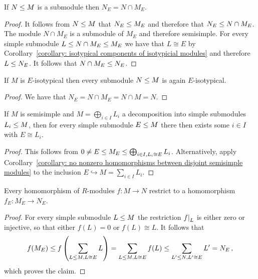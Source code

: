 \begin{lemma}
  If $N \leq M$ is a submodule then $N_E = N \cap M_E$.
\end{lemma}


\begin{proof}
  It follows from $N \leq M$ that $N_E \leq M_E$ and therefore that $N_E \leq N \cap M_E$.
  The module $N \cap M_E$ is a submodule of $M_E$ and therefore semisimple.
  For every simple submodule $L \leq N \cap M_E \leq M_E$ we have that $L \cong E$ by Corollary~\ref{corollary: isotypical components of isotypicial modules} and therefore $L \leq N_E$.
  It follows that $N \cap M_E \leq N_E$.
\end{proof}


\begin{corollary}
  If $M$ is $E$-isotypical then every submodule $N \leq M$ is again $E$-isotypical.
\end{corollary}


\begin{proof}
  We have that $N_E = N \cap M_E = N \cap M = N$.
\end{proof}


\begin{lemma}
  If $M$ is semisimple and $M = \bigoplus_{i \in I} L_i$ a decomposition into simple submodules $L_i \leq M$, then for every simple submodule $E \leq M$ there then exists some $i \in I$ with $E \cong L_i$.
\end{lemma}


\begin{proof}
  This follows from $0 \neq E \leq M_E \leq \bigoplus_{i \in I, L_i \cong E} L_i$.
  Alternatively, apply Corollary~\ref{corollary: no nonzero homomorphisms between disjoint semisimple modules} to the inclusion $E \hookrightarrow M = \sum_{i \in I} L_i$.
\end{proof}


\begin{lemma}
  \label{lemma: functioriality of isotypical components}
  Every homomorphism of $R$-modules $f \colon M \to N$ restrict to a homomorphism $f_E \colon M_E \to N_E$.
\end{lemma}


\begin{proof}
  For every simple submodule $L \leq M$ the restriction $\restrict{f}{L}$ is either zero or injective, so that either $f(L) = 0$ or $f(L) \cong L$.
  It follows that
  \[
              f(M_E)
    \leq f\left(\sum_{L \leq M, L \cong E} L \right)
    =         \sum_{L \leq M, L \cong E} f(L)
    \leq \sum_{L' \leq N, L' \cong E} L'
    =         N_E \,,
  \]
  which proves the claim.
\end{proof}


